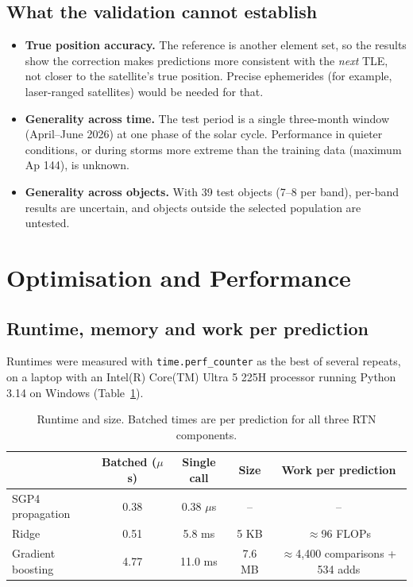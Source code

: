 \documentclass[11pt, a4paper]{article}
\begin{document}
\subsection{What the validation cannot establish}

\begin{itemize}
\item \textbf{True position accuracy.} The reference is another element set, so the results show the correction makes predictions more consistent with the \emph{next} TLE, not closer to the satellite's true position. Precise ephemerides (for example, laser-ranged satellites) would be needed for that.
\item \textbf{Generality across time.} The test period is a single three-month window (April--June 2026) at one phase of the solar cycle. Performance in quieter conditions, or during storms more extreme than the training data (maximum Ap 144), is unknown.
\item \textbf{Generality across objects.} With 39 test objects (7--8 per band), per-band results are uncertain, and objects outside the selected population are untested.
\end{itemize}

\section{Optimisation and Performance}\label{sec:6}

\subsection{Runtime, memory and work per prediction}

Runtimes were measured with \texttt{time.perf\_counter} as the best of several repeats, on a laptop with an Intel(R) Core(TM) Ultra 5 225H processor running Python 3.14 on Windows (Table~\ref{tab:perf}).

\begin{table}[htbp]
\centering
\small
\caption{Runtime and size. Batched times are per prediction for all three RTN components.}
\label{tab:perf}
\begin{tabular}{lcccc}
\toprule
 & Batched ($\mu$s) & Single call & Size & Work per prediction \\
\midrule
SGP4 propagation & 0.38 & 0.38 $\mu$s & -- & -- \\
Ridge & 0.51 & 5.8 ms & 5 KB & $\approx$96 FLOPs \\
Gradient boosting & 4.77 & 11.0 ms & 7.6 MB & $\approx$4,400 comparisons + 534 adds \\
\bottomrule
\end{tabular}
\end{table}
\end{document}
